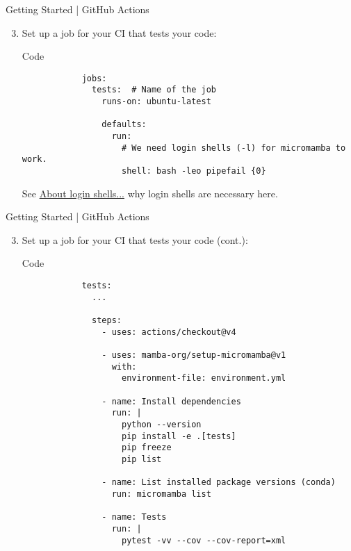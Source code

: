 \begin{frame}[fragile]{Getting Started | GitHub Actions}
  \begin{enumerate}
      \setcounter{enumi}{2}
      \item Set up a job for your CI that tests your code:
        \begin{block}{Code}
          \begin{verbatim}
            jobs:
              tests:  # Name of the job
                runs-on: ubuntu-latest

                defaults:
                  run:
                    # We need login shells (-l) for micromamba to work.
                    shell: bash -leo pipefail {0}
          \end{verbatim}
        \end{block}
        \textcolor{vertexLightGrey}{See} \href{https://github.com/mamba-org/setup-micromamba?tab=readme-ov-file#about-login-shells}{About login shells...}
        \textcolor{vertexLightGrey}{why login shells are necessary here.}
    \end{enumerate}
\end{frame}

\begin{frame}[fragile]{
    Getting Started | GitHub Actions
    \hfill
  }
  \begin{enumerate}
    \setcounter{enumi}{2}
    \item Set up a job for your CI that tests your code (cont.):
      \begin{block}{Code}
        \footnotesize
        \begin{verbatim}
            tests:
              ...

              steps:
                - uses: actions/checkout@v4

                - uses: mamba-org/setup-micromamba@v1
                  with:
                    environment-file: environment.yml

                - name: Install dependencies
                  run: |
                    python --version
                    pip install -e .[tests]
                    pip freeze
                    pip list

                - name: List installed package versions (conda)
                  run: micromamba list

                - name: Tests
                  run: |
                    pytest -vv --cov --cov-report=xml
        \end{verbatim}
      \end{block}
  \end{enumerate}
\end{frame}

